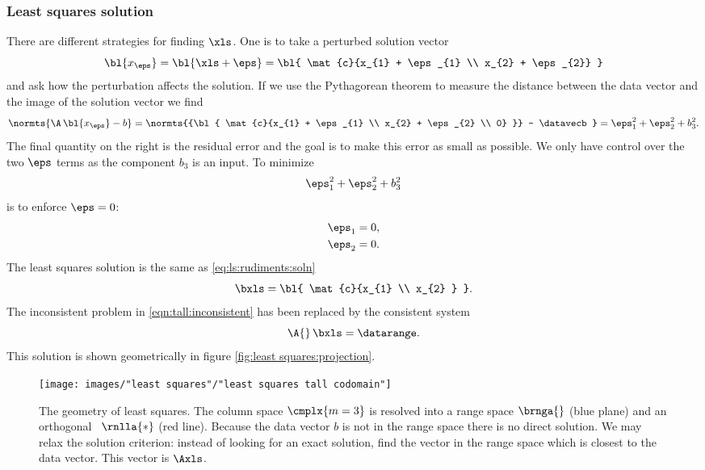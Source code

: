 \subsubsection{Least squares solution}
There are different strategies for finding $\xls$. One is to take a perturbed solution vector
\begin{equation}
  {\bl{ x_{\eps} }} = {\bl{ \xls + \eps }} = {\bl{ \mat{c}{x_{1} + \eps_{1} \\ x_{2} + \eps_{2}} }}
\end{equation}
and ask how the perturbation affects the solution. If we use the Pythagorean theorem to measure the distance between the data vector and the image of the solution vector we find
%
\begin{equation}
  \normts{\A\,{\bl{ x_{\eps} }} - b} = \normts{{\bl{ \mat{c}{x_{1} + \eps_{1} \\ x_{2} + \eps_{2} \\ 0} }} - \datavecb} = \eps_{1}^{2} + \eps_{2}^{2} + b_{3}^{2}.
\end{equation}
%
The final quantity on the right is the residual error and the goal is to make this error as small as possible.
We only have control over the two $\eps$ terms as the component $b_{3}$ is an input. To minimize 
\begin{equation*}
  \eps_{1}^{2} + \eps_{2}^{2} + b_{3}^{2}
\end{equation*}
is to enforce $\eps = 0$:
\begin{equation}
  \begin{split}
    \eps_{1} &= 0, \\
    \eps_{2} &= 0. 
  \end{split}
\end{equation}
The least squares solution is the same as \eqref{eq:ls:rudiments:soln}
\begin{equation}
  \bxls = {\bl{ \mat{c}{x_{1} \\ x_{2} } }}.
\end{equation}
The inconsistent problem in \eqref{eqn:tall:inconsistent} has been replaced by the consistent system
%
\begin{equation}
  \A{}\, \bxls = \datarange.
\end{equation}
This solution is shown geometrically in figure \eqref{fig:least squares:projection}.
\begin{figure}[htbp] %
   \centering
   \texttt{[image: images/"least squares"/"least squares tall codomain"]} 
   \caption[The geometry of least squares]{The geometry of least squares. The column space $\cmplx{m=3}$ is resolved into a range space $\brnga{}$ (blue plane) and an orthogonal \ns \ $\rnlla{*}$ (red line). Because the data vector $b$ is not in the range space there is no direct solution. We may relax the solution criterion: instead of looking for an exact solution, find the vector in the range space which is closest to the data vector. This vector is $\Axls$.}
   \label{fig:least squares:projection}
\end{figure}


